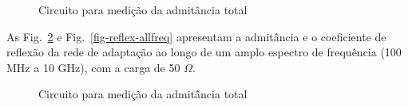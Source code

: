 \documentclass[
  number,
  preprint]{elsarticle}
\begin{document}
\begin{figure}


\caption{\label{fig-impedance-smith-Lnet}Circuito para medição da
admitância total}

\end{figure}%

As Fig.~\ref{fig-admit-allfreqe} e Fig.~\ref{fig-reflex-allfreq}
apresentam a admitância e o coeficiente de reflexão da rede de adaptação
ao longo de um amplo espectro de frequência (100 MHz a 10 GHz), com a
carga de 50 \(\Omega\).

\begin{figure}


\caption{\label{fig-admit-allfreqe}Circuito para medição da admitância
total}

\end{figure}%
\end{document}
